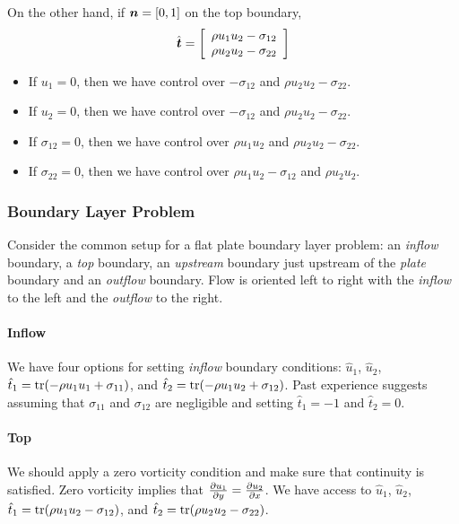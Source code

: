 \documentclass{article}
\begin{document}
On the other hand, if $\boldsymbol n=[0,1]$ on the top boundary,
\begin{equation*}
\hat{\boldsymbol t}=\left[ 
\begin{array}{c}
\rho u_1u_2-\sigma_{12} \\
\rho u_2u_2-\sigma_{22} \\
\end{array}
 \right]
\end{equation*}
\begin{itemize}
  \item If $u_1=0$, then we have control over $-\sigma_{12}$ and $\rho u_2u_2-\sigma_{22}$.
  \item If $u_2=0$, then we have control over $-\sigma_{12}$ and $\rho u_2u_2-\sigma_{22}$.
  \item If $\sigma_{12}=0$, then we have control over $\rho u_1u_2$ and $\rho u_2u_2-\sigma_{22}$.
  \item If $\sigma_{22}=0$, then we have control over $\rho u_1u_2-\sigma_{12}$ and $\rho u_2u_2$.
\end{itemize}

\subsubsection*{Boundary Layer Problem}
Consider the common setup for a flat plate boundary layer problem: an \emph{inflow} boundary, a \emph{top} boundary, an \emph{upstream} boundary just upstream of the \emph{plate} boundary and an \emph{outflow} boundary. Flow is oriented left to right with the \emph{inflow} to the left and the \emph{outflow} to the right.

\paragraph*{Inflow}
We have four options for setting \emph{inflow} boundary conditions: $\hat u_1$, $\hat u_2$,
$\hat t_1=\operatorname*{tr}(-\rho u_1u_1+\sigma_{11})$, and $\hat t_2=\operatorname*{tr}(-\rho u_1u_2+\sigma_{12})$.
Past experience suggests assuming that $\sigma_{11}$ and $\sigma_{12}$ are negligible and setting $\hat t_1=-1$ and $\hat t_2=0$.

\paragraph*{Top}
We should apply a zero vorticity condition and make sure that continuity is satisfied.
Zero vorticity implies that $\frac{\partial u_1}{\partial y}=\frac{\partial u_2}{\partial x}$.
We have access to $\hat u_1$, $\hat u_2$,
$\hat t_1=\operatorname*{tr}(\rho u_1u_2-\sigma_{12})$, and $\hat t_2=\operatorname*{tr}(\rho u_2u_2-\sigma_{22})$.
\end{document}
